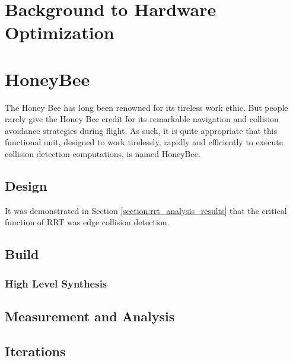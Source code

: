 
\section{Background to Hardware Optimization}

\section{HoneyBee}
    The Honey Bee has long been renowned for its tireless work ethic. But people rarely give the Honey Bee credit for its remarkable navigation and collision avoidance strategies during flight. As such, it is quite appropriate that this functional unit, designed to work tirelessly, rapidly and efficiently to execute collision detection computations, is named HoneyBee.

    \subsection{Design}
        It was demonstrated in Section \ref{section:rrt_analysis_results} that the critical function of \ac{RRT} was edge collision detection.
    \subsection{Build}
        \subsubsection*{High Level Synthesis}
    \subsection{Measurement and Analysis}
        
    \subsection{Iterations}